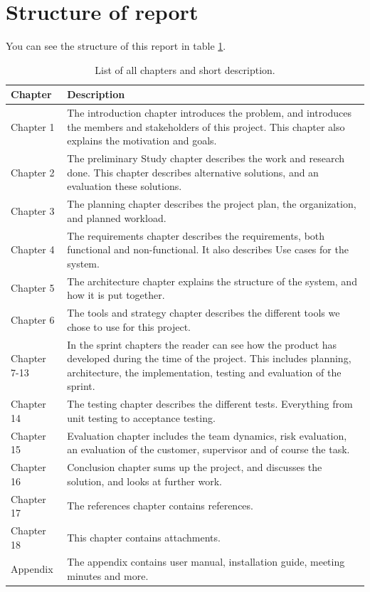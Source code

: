 \section{Structure of report}
You can see the structure of this report in table \ref{tab:structure_of_report}.
\begin{table}[!ht]\centering
\caption{List of all chapters and short description. }
\label{tab:structure_of_report}
\def\arraystretch{1.3}
\begin{tabularx}{\textwidth}{lX} \toprule[1mm]
\textbf{Chapter} & \textbf{Description} \\ \midrule
Chapter 1 & The introduction chapter introduces the problem, and introduces the members and stakeholders of this project.
This chapter also explains the motivation and goals. \\
Chapter 2 &  The preliminary Study chapter describes the work and research done. This chapter describes alternative solutions, and an evaluation these solutions. \\
Chapter 3 &  The planning chapter describes the project plan, the organization, and planned workload.  \\

Chapter 4 &  The requirements chapter describes the requirements, both functional and non-functional. It also describes Use cases for the system. \\

Chapter 5	 &  The architecture chapter explains the structure of the system, and how it is put together. \\

Chapter 6	 &   The tools and strategy chapter describes the different tools we chose to use for this project.\\

Chapter 7-13 	&  In the sprint chapters the reader can see how the product has developed during the time of the project. This includes planning, architecture, the implementation, testing and evaluation of the sprint. \\

Chapter 14 	 &  The testing chapter describes the different tests. Everything from unit testing to acceptance testing. \\

Chapter 15 	 &  Evaluation chapter includes the team dynamics, risk evaluation, an evaluation of the customer, supervisor and of course the task. \\

Chapter 16 	 &  Conclusion chapter sums up the project, and discusses the solution, and looks at further work. \\

Chapter 17 	 &  The references chapter contains references. \\

Chapter 18 	 &  This chapter contains attachments. \\
\midrule
Appendix 	 &   The appendix contains user manual, installation guide, meeting minutes and more.\\

\bottomrule[1mm]
\end{tabularx}
\end{table}

